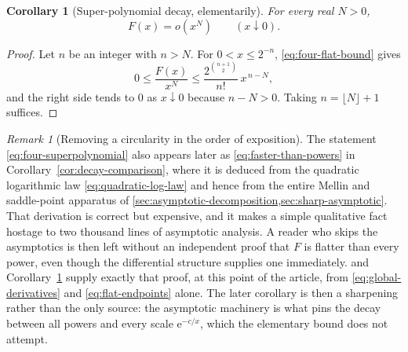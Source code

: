 \documentclass[11pt,oneside]{article}
\newtheorem{corollary}[theorem]{Corollary}
\theoremstyle{definition}
\theoremstyle{remark}
\newtheorem{remark}[theorem]{Remark}
\newcommand{\e}{\mathrm e}
\newcommand{\smallo}{o}
\begin{document}
\begin{corollary}[Super-polynomial decay, elementarily]
\label{cor:four-superpolynomial}
For every real $N>0$,
\begin{equation}
 F(x)=\smallo(x^N)\qquad(x\downarrow0).                    \label{eq:four-superpolynomial}
\end{equation}
\end{corollary}

\begin{proof}
Let $n$ be an integer with $n>N$.  For $0<x\le2^{-n}$, \eqref{eq:four-flat-bound} gives
\begin{equation*}
 0\le\frac{F(x)}{x^N}\le\frac{2^{\binom{n+1}{2}}}{n!}\,x^{\,n-N},
\end{equation*}
and the right side tends to $0$ as $x\downarrow0$ because $n-N>0$.  Taking $n=\lfloor
N\rfloor+1$ suffices.
\end{proof}

\begin{remark}[Removing a circularity in the order of exposition]
\label{rem:four-noncircular}
The statement \eqref{eq:four-superpolynomial} also appears later as
\eqref{eq:faster-than-powers} in Corollary~\ref{cor:decay-comparison}, where it is deduced
from the quadratic logarithmic law \eqref{eq:quadratic-log-law} and hence from the entire Mellin and
saddle-point apparatus of \cref{sec:asymptotic-decomposition,sec:sharp-asymptotic}.  That
derivation is correct but expensive, and it makes a simple qualitative fact hostage to two
thousand lines of asymptotic analysis.  A reader who skips the asymptotics is then left
without an independent proof that $F$ is flatter than every power, even though the
differential structure supplies one immediately.   and
Corollary~\ref{cor:four-superpolynomial} supply exactly that proof, at this point of the
article, from \eqref{eq:global-derivatives} and \eqref{eq:flat-endpoints} alone.  The later corollary is
then a sharpening rather than the only source: the asymptotic machinery is what pins the
decay between all powers and every scale $\e^{-c/x}$, which the elementary bound does not
attempt.
\end{remark}
\end{document}
